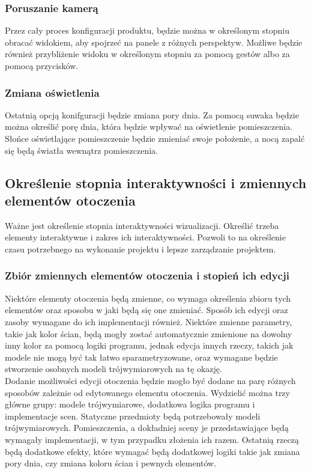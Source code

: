 \documentclass{article} %
\begin{document}
        \subsubsection{Poruszanie kamerą}
        Przez cały proces konfiguracji produktu, będzie można w określonym stopniu obracać widokiem, aby spojrzeć na panele z różnych perspektyw. Możliwe będzie również przybliżenie widoku w określonym stopniu za pomocą gestów albo za pomocą przycisków. 
        \\
        
        \subsubsection{Zmiana oświetlenia}
        Ostatnią opcją konifguracji będzie zmiana pory dnia. Za pomocą suwaka będzie można określić porę dnia, która będzie wpływać na oświetlenie pomieszczenia. Słońce oświetlające pomieszczenie będzie zmieniać swoje położenie, a nocą zapalć się będą światła wewnątrz pomieszczenia.
        \\
    \subsection{Określenie stopnia interaktywności i zmiennych elementów otoczenia}
        Ważne jest określenie stopnia interaktywności wizualizacji. Określić trzeba elementy interaktywne i zakres ich interaktywności. Pozwoli to na określenie czasu potrzebnego na wykonanie projektu i lepsze zarządzanie projektem. 
        \\
        
        \subsubsection{Zbiór zmiennych elementów otoczenia i stopień ich edycji}
        Niektóre elementy otoczenia będą zmienne, co wymaga określenia zbioru tych elementów oraz sposobu w jaki będą się one zmieniać. Sposób ich edycji oraz zasoby wymagane do ich implementacji również. Niektóre zmienne parametry, takie jak kolor ścian, będą mogły zostać automatycznie zmienione na dowolny inny kolor za pomocą logiki programu, jednak edycja innych rzeczy, takich jak modele nie mogą być tak łatwo sparametryzowane, oraz wymagane będzie stworzenie osobnych modeli trójwymiarowych na tę okazję.
        \\
        
        Dodanie możliwości edycji otoczenia będzie mogło być dodane na parę różnych sposobów zależnie od edytowanego elementu otoczenia. Wydzielić można trzy główne grupy: modele trójwymiarowe, dodatkowa logika programu i implementacje scen. Statyczne przedmioty będą potrzebowały modeli trójwymiarowych. Pomieszczenia, a dokładniej sceny je przedstawiające będą wymagały implementacji, w tym przypadku złożenia ich razem. Ostatnią rzeczą będą dodatkowe efekty, które wymagać będą dodatkowej logiki takie jak zmiana pory dnia, czy zmiana koloru ścian i pewnych elementów.
        \\
        
\end{document}
